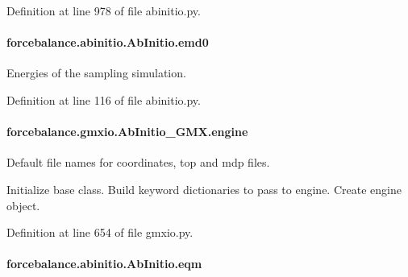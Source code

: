 Definition at line 978 of file abinitio.\-py.

\hypertarget{classforcebalance_1_1abinitio_1_1AbInitio_af928d333d14cb3b93f7db78530455873}{
\paragraph[{emd0}]{\setlength{\rightskip}{0pt plus 5cm}forcebalance.\-abinitio.\-Ab\-Initio.\-emd0\hspace{0.3cm}{\ttfamily [inherited]}}}\label{classforcebalance_1_1abinitio_1_1AbInitio_af928d333d14cb3b93f7db78530455873}


Energies of the sampling simulation. 



Definition at line 116 of file abinitio.\-py.

\hypertarget{classforcebalance_1_1gmxio_1_1AbInitio__GMX_a3a8e9fb9ebb663f176981314855db794}{
\paragraph[{engine}]{\setlength{\rightskip}{0pt plus 5cm}forcebalance.\-gmxio.\-Ab\-Initio\-\_\-\-G\-M\-X.\-engine}}\label{classforcebalance_1_1gmxio_1_1AbInitio__GMX_a3a8e9fb9ebb663f176981314855db794}


Default file names for coordinates, top and mdp files. 

Initialize base class. Build keyword dictionaries to pass to engine. Create engine object. 

Definition at line 654 of file gmxio.\-py.

\hypertarget{classforcebalance_1_1abinitio_1_1AbInitio_a64387fae9bdfb0d03ca6961e67c779be}{
\paragraph[{eqm}]{\setlength{\rightskip}{0pt plus 5cm}forcebalance.\-abinitio.\-Ab\-Initio.\-eqm\hspace{0.3cm}{\ttfamily [inherited]}}}\label{classforcebalance_1_1abinitio_1_1AbInitio_a64387fae9bdfb0d03ca6961e67c779be}


